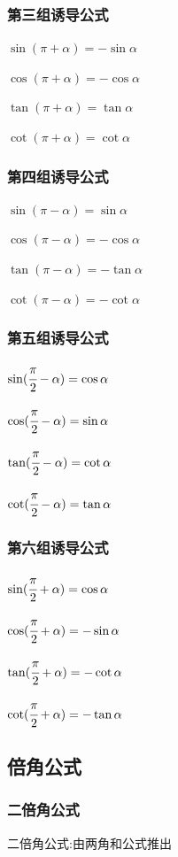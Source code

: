 {{  \subsubsection{第三组诱导公式}{
    $\sin(\pi + \alpha) = -\sin\alpha$

    $\cos(\pi + \alpha) = -\cos\alpha$

    $\tan(\pi + \alpha) = \tan\alpha$

    $\cot(\pi + \alpha) = \cot\alpha$
  }%

  \subsubsection{第四组诱导公式}{
    $\sin(\pi - \alpha) = \sin\alpha$

    $\cos(\pi - \alpha) = -\cos\alpha$

    $\tan(\pi - \alpha) = -\tan\alpha$

    $\cot(\pi - \alpha) = -\cot\alpha$
  }%

  \subsubsection{第五组诱导公式}{
    $\sin(\cfrac{\pi}{2} - \alpha) = \cos\alpha$

    $\cos(\cfrac{\pi}{2} - \alpha) = \sin\alpha$

    $\tan(\cfrac{\pi}{2} - \alpha) = \cot\alpha$

    $\cot(\cfrac{\pi}{2} - \alpha) = \tan\alpha$
  }%

  \subsubsection{第六组诱导公式}{
    $\sin(\cfrac{\pi}{2} + \alpha) = \cos\alpha$

    $\cos(\cfrac{\pi}{2} + \alpha) = -\sin\alpha$

    $\tan(\cfrac{\pi}{2} + \alpha) = -\cot\alpha$

    $\cot(\cfrac{\pi}{2} + \alpha) = -\tan\alpha$
  }%

}%

\subsection{倍角公式}{

  \subsubsection{二倍角公式}{
    二倍角公式:由两角和公式推出

}}}

